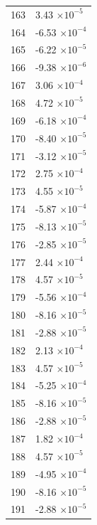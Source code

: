 \documentclass[a4paper,11pt]{article}
\begin{document}
\begin{center}
\begin{longtable}{|R{1.5cm}|R{2.5cm}|}
  163 &         3.43 $\times 10^{          -5}$ \\
  164 &        -6.53 $\times 10^{          -4}$ \\
  165 &        -6.22 $\times 10^{          -5}$ \\
  166 &        -9.38 $\times 10^{          -6}$ \\
  167 &         3.06 $\times 10^{          -4}$ \\
  168 &         4.72 $\times 10^{          -5}$ \\
  169 &        -6.18 $\times 10^{          -4}$ \\
  170 &        -8.40 $\times 10^{          -5}$ \\
  171 &        -3.12 $\times 10^{          -5}$ \\
  172 &         2.75 $\times 10^{          -4}$ \\
  173 &         4.55 $\times 10^{          -5}$ \\
  174 &        -5.87 $\times 10^{          -4}$ \\
  175 &        -8.13 $\times 10^{          -5}$ \\
  176 &        -2.85 $\times 10^{          -5}$ \\
  177 &         2.44 $\times 10^{          -4}$ \\
  178 &         4.57 $\times 10^{          -5}$ \\
  179 &        -5.56 $\times 10^{          -4}$ \\
  180 &        -8.16 $\times 10^{          -5}$ \\
  181 &        -2.88 $\times 10^{          -5}$ \\
  182 &         2.13 $\times 10^{          -4}$ \\
  183 &         4.57 $\times 10^{          -5}$ \\
  184 &        -5.25 $\times 10^{          -4}$ \\
  185 &        -8.16 $\times 10^{          -5}$ \\
  186 &        -2.88 $\times 10^{          -5}$ \\
  187 &         1.82 $\times 10^{          -4}$ \\
  188 &         4.57 $\times 10^{          -5}$ \\
  189 &        -4.95 $\times 10^{          -4}$ \\
  190 &        -8.16 $\times 10^{          -5}$ \\
  191 &        -2.88 $\times 10^{          -5}$ \\

\end{longtable}
\end{center}
\end{document}
